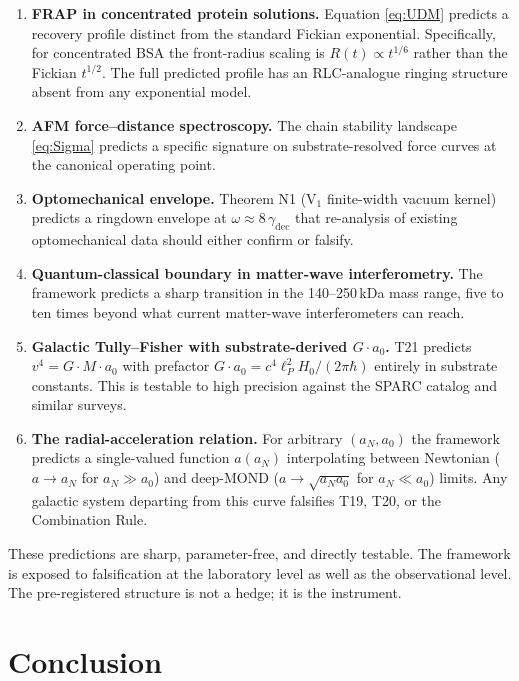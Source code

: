 \documentclass[11pt,a4paper]{article}
\begin{document}
\begin{enumerate}[leftmargin=1.5em, itemsep=2pt]
\item \textbf{FRAP in concentrated protein solutions.} Equation \eqref{eq:UDM} predicts a recovery profile distinct from the standard Fickian exponential. Specifically, for concentrated BSA the front-radius scaling is $R(t) \propto t^{1/6}$ rather than the Fickian $t^{1/2}$. The full predicted profile has an RLC-analogue ringing structure absent from any exponential model.
\item \textbf{AFM force--distance spectroscopy.} The chain stability landscape \eqref{eq:Sigma} predicts a specific signature on substrate-resolved force curves at the canonical operating point.
\item \textbf{Optomechanical envelope.} Theorem N1 (V$_1$ finite-width vacuum kernel) predicts a ringdown envelope at $\omega \approx 8\, \gamma_\mathrm{dec}$ that re-analysis of existing optomechanical data should either confirm or falsify.
\item \textbf{Quantum-classical boundary in matter-wave interferometry.} The framework predicts a sharp transition in the 140--250\,kDa mass range, five to ten times beyond what current matter-wave interferometers can reach.
\item \textbf{Galactic Tully--Fisher with substrate-derived $G \cdot a_0$.} T21 predicts $v^4 = G \cdot M \cdot a_0$ with prefactor $G \cdot a_0 = c^4 \ell_P^2 H_0 / (2\pi \hbar)$ entirely in substrate constants. This is testable to high precision against the SPARC catalog and similar surveys.
\item \textbf{The radial-acceleration relation.} For arbitrary $(a_N, a_0)$ the framework predicts a single-valued function $a(a_N)$ interpolating between Newtonian ($a \to a_N$ for $a_N \gg a_0$) and deep-MOND ($a \to \sqrt{a_N a_0}$ for $a_N \ll a_0$) limits. Any galactic system departing from this curve falsifies T19, T20, or the Combination Rule.
\end{enumerate}

These predictions are sharp, parameter-free, and directly testable. The framework is exposed to falsification at the laboratory level as well as the observational level. The pre-registered structure is not a hedge; it is the instrument.

\section{Conclusion}\label{sec:conclusion}
\end{document}
